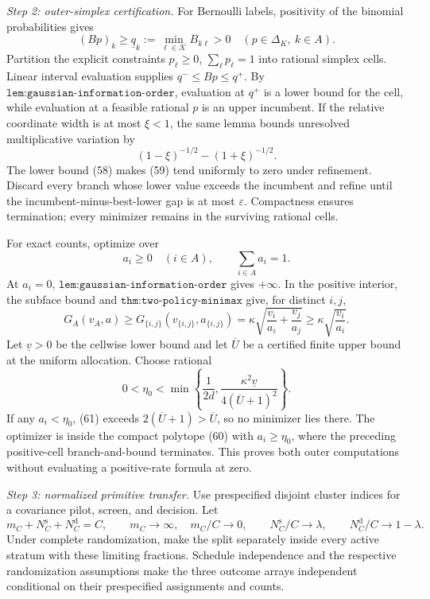 \emph{Step 2: outer-simplex certification.}
For Bernoulli labels, positivity of the binomial probabilities gives
\[
(Bp)_k\geq\underline q_k:=\min_{\ell\in\mathcal K}B_{k\ell}>0
\quad(p\in\Delta_K,\ k\in A). \tag{58}
\]
Partition the explicit constraints \(p_\ell\geq0\), \(\sum_\ell p_\ell=1\) into rational simplex cells.  Linear interval evaluation supplies \(q^-\leq Bp\leq q^+\).  By \(\texttt{lem:gaussian-information-order}\), evaluation at \(q^+\) is a lower bound for the cell, while evaluation at a feasible rational \(p\) is an upper incumbent.  If the relative coordinate width is at most \(\xi<1\), the same lemma bounds unresolved multiplicative variation by
\[
(1-\xi)^{-1/2}-(1+\xi)^{-1/2}. \tag{59}
\]
The lower bound (58) makes (59) tend uniformly to zero under refinement.  Discard every branch whose lower value exceeds the incumbent and refine until the incumbent-minus-best-lower gap is at most \(\varepsilon\).  Compactness ensures termination; every minimizer remains in the surviving rational cells.

For exact counts, optimize over
\[
a_i\geq0\quad(i\in A),\qquad\sum_{i\in A}a_i=1. \tag{60}
\]
At \(a_i=0\), \(\texttt{lem:gaussian-information-order}\) gives \(+\infty\).  In the positive interior, the subface bound and \(\texttt{thm:two-policy-minimax}\) give, for distinct \(i,j\),
\[
G_A(v_A,a)\geq G_{\{i,j\}}(v_{\{i,j\}},a_{\{i,j\}})
=\kappa\sqrt{\frac{v_i}{a_i}+\frac{v_j}{a_j}}
\geq\kappa\sqrt{\frac{v_i}{a_i}}. \tag{61}
\]
Let \(\underline v>0\) be the cellwise lower bound and let \(\overline U\) be a certified finite upper bound at the uniform allocation.  Choose rational
\[
0<\eta_0<\min\left\{\frac1{2d},
\frac{\kappa^2\underline v}{4(\overline U+1)^2}\right\}. \tag{62}
\]
If any \(a_i<\eta_0\), (61) exceeds \(2(\overline U+1)>\overline U\), so no minimizer lies there.  The optimizer is inside the compact polytope (60) with \(a_i\geq\eta_0\), where the preceding positive-cell branch-and-bound terminates.  This proves both outer computations without evaluating a positive-rate formula at zero.

\emph{Step 3: normalized primitive transfer.}
Use prespecified disjoint cluster indices for a covariance pilot, screen, and decision.  Let
\[
 m_C+N_C^{\mathrm s}+N_C^{\mathrm d}=C,\qquad
m_C\to\infty,\quad m_C/C\to0,\qquad
N_C^{\mathrm s}/C\to\lambda,\qquad
N_C^{\mathrm d}/C\to1-\lambda. \tag{63}
\]
Under complete randomization, make the split separately inside every active stratum with these limiting fractions.  Schedule independence and the respective randomization assumptions make the three outcome arrays independent conditional on their prespecified assignments and counts.

